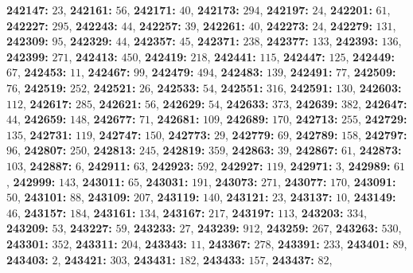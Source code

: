 \textsf{\bfseries 242147:} $23$, \textsf{\bfseries 242161:} $56$, \textsf{\bfseries 242171:} $40$, \textsf{\bfseries 242173:} $294$, \textsf{\bfseries 242197:} $24$, \textsf{\bfseries 242201:} $61$, \textsf{\bfseries 242227:} $295$, \textsf{\bfseries 242243:} $44$, \textsf{\bfseries 242257:} $39$, \textsf{\bfseries 242261:} $40$, \textsf{\bfseries 242273:} $24$, \textsf{\bfseries 242279:} $131$, \textsf{\bfseries 242309:} $95$, \textsf{\bfseries 242329:} $44$, \textsf{\bfseries 242357:} $45$, \textsf{\bfseries 242371:} $238$, \textsf{\bfseries 242377:} $133$, \textsf{\bfseries 242393:} $136$, \textsf{\bfseries 242399:} $271$, \textsf{\bfseries 242413:} $450$, \textsf{\bfseries 242419:} $218$, \textsf{\bfseries 242441:} $115$, \textsf{\bfseries 242447:} $125$, \textsf{\bfseries 242449:} $67$, \textsf{\bfseries 242453:} $11$, \textsf{\bfseries 242467:} $99$, \textsf{\bfseries 242479:} $494$, \textsf{\bfseries 242483:} $139$, \textsf{\bfseries 242491:} $77$, \textsf{\bfseries 242509:} $76$, \textsf{\bfseries 242519:} $252$, \textsf{\bfseries 242521:} $26$, \textsf{\bfseries 242533:} $54$, \textsf{\bfseries 242551:} $316$, \textsf{\bfseries 242591:} $130$, \textsf{\bfseries 242603:} $112$, \textsf{\bfseries 242617:} $285$, \textsf{\bfseries 242621:} $56$, \textsf{\bfseries 242629:} $54$, \textsf{\bfseries 242633:} $373$, \textsf{\bfseries 242639:} $382$, \textsf{\bfseries 242647:} $44$, \textsf{\bfseries 242659:} $148$, \textsf{\bfseries 242677:} $71$, \textsf{\bfseries 242681:} $109$, \textsf{\bfseries 242689:} $170$, \textsf{\bfseries 242713:} $255$, \textsf{\bfseries 242729:} $135$, \textsf{\bfseries 242731:} $119$, \textsf{\bfseries 242747:} $150$, \textsf{\bfseries 242773:} $29$, \textsf{\bfseries 242779:} $69$, \textsf{\bfseries 242789:} $158$, \textsf{\bfseries 242797:} $96$, \textsf{\bfseries 242807:} $250$, \textsf{\bfseries 242813:} $245$, \textsf{\bfseries 242819:} $359$, \textsf{\bfseries 242863:} $39$, \textsf{\bfseries 242867:} $61$, \textsf{\bfseries 242873:} $103$, \textsf{\bfseries 242887:} $6$, \textsf{\bfseries 242911:} $63$, \textsf{\bfseries 242923:} $592$, \textsf{\bfseries 242927:} $119$, \textsf{\bfseries 242971:} $3$, \textsf{\bfseries 242989:} $61$, \textsf{\bfseries 242999:} $143$, \textsf{\bfseries 243011:} $65$, \textsf{\bfseries 243031:} $191$, \textsf{\bfseries 243073:} $271$, \textsf{\bfseries 243077:} $170$, \textsf{\bfseries 243091:} $50$, \textsf{\bfseries 243101:} $88$, \textsf{\bfseries 243109:} $207$, \textsf{\bfseries 243119:} $140$, \textsf{\bfseries 243121:} $23$, \textsf{\bfseries 243137:} $10$, \textsf{\bfseries 243149:} $46$, \textsf{\bfseries 243157:} $184$, \textsf{\bfseries 243161:} $134$, \textsf{\bfseries 243167:} $217$, \textsf{\bfseries 243197:} $113$, \textsf{\bfseries 243203:} $334$, \textsf{\bfseries 243209:} $53$, \textsf{\bfseries 243227:} $59$, \textsf{\bfseries 243233:} $27$, \textsf{\bfseries 243239:} $912$, \textsf{\bfseries 243259:} $267$, \textsf{\bfseries 243263:} $530$, \textsf{\bfseries 243301:} $352$, \textsf{\bfseries 243311:} $204$, \textsf{\bfseries 243343:} $11$, \textsf{\bfseries 243367:} $278$, \textsf{\bfseries 243391:} $233$, \textsf{\bfseries 243401:} $89$, \textsf{\bfseries 243403:} $2$, \textsf{\bfseries 243421:} $303$, \textsf{\bfseries 243431:} $182$, \textsf{\bfseries 243433:} $157$, \textsf{\bfseries 243437:} $82$, 
